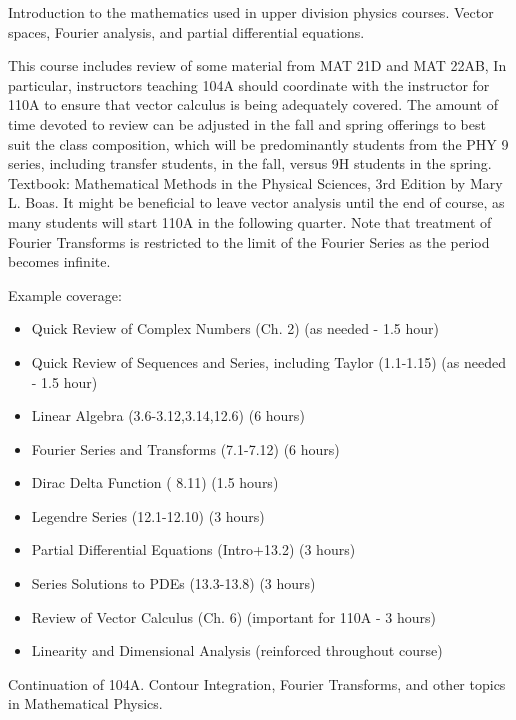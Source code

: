 \documentclass[12pt]{article}
\begin{document}
\vskip 1cm
Introduction to the mathematics used in upper division physics
courses. Vector spaces, Fourier analysis, and partial differential
equations.

This course includes review of some material from MAT 21D and MAT
22AB, In particular, instructors teaching 104A should coordinate with
the instructor for 110A to ensure that vector calculus is being
adequately covered.  The amount of time devoted to review can be
adjusted in the fall and spring offerings to best suit the class
composition, which will be predominantly students from the PHY 9
series, including transfer students, in the fall, versus 9H students
in the spring.  Textbook: Mathematical Methods in the Physical
Sciences, 3rd Edition by Mary L. Boas.  It might be beneficial to
leave vector analysis until the end of course, as many students will
start 110A in the following quarter.  Note that treatment of Fourier
Transforms is restricted to the limit of the Fourier Series as the
period becomes infinite.

\begin{samepage}
Example coverage:
\begin{itemize}
\item Quick Review of Complex Numbers (Ch. 2) (as needed - 1.5 hour)
\item Quick Review of Sequences and Series, including Taylor (1.1-1.15) (as needed - 1.5 hour)
\item Linear Algebra (3.6-3.12,3.14,12.6) (6 hours)
\item Fourier Series and Transforms (7.1-7.12) (6 hours)
\item Dirac Delta Function ( 8.11) (1.5 hours)
\item Legendre Series (12.1-12.10) (3 hours)
\item Partial Differential Equations (Intro+13.2) (3 hours)
\item Series Solutions to PDEs (13.3-13.8) (3 hours)
\item Review of Vector Calculus (Ch. 6) (important for 110A - 3 hours)
\item Linearity and Dimensional Analysis (reinforced throughout course)
\end{itemize}
\end{samepage}

\vskip 1cm
Continuation of 104A.  Contour Integration, Fourier Transforms, and other topics in Mathematical Physics.
\end{document}
